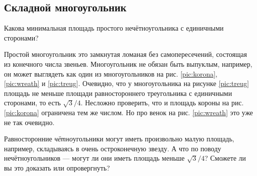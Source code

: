 \subsection*{Складной многоугольник}\label{Складной многоугольник}

Какова минимальная площадь простого нечётноугольника с единичными сторонами?

Простой многоугольник это замкнутая ломаная без самопересечений, состоящая из конечного числа звеньев.
Многоугольник не обязан быть выпуклым,
например, он может выглядеть как один из многоугольников на рис. \ref{pic:korona},
\ref{pic:wreath} и \ref{pic:treug}.
Очевидно, что у многоугольника на рисунке \ref{pic:treug} площадь не меньше площади равностороннего треугольника с единичными сторонами, то есть $\sqrt{3}/4$.
Несложно проверить, что и площадь короны на рис. \ref{pic:korona} ограничена тем же числом.
Но про венок на рис. \ref{pic:wreath} это уже не так очевидно.

Равносторонние \emph{чётно}угольники могут иметь произвольно малую площадь, например, складываясь в очень остроконечную звезду.
А что по поводу нечётноугольников --- могут ли они иметь площадь меньше $\sqrt{3}/4$?
Сможете ли вы это доказать или опровергнуть?

